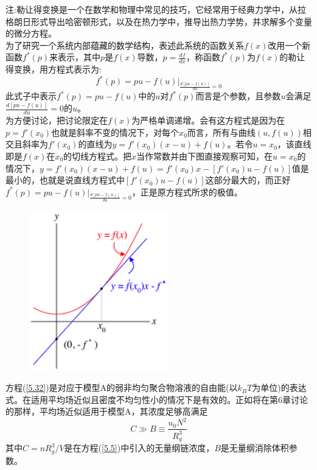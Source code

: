 注:勒让得变换是一个在数学和物理中常见的技巧，它经常用于经典力学中，从拉格朗日形式导出哈密顿形式，以及在热力学中，推导出热力学势，并求解多个变量的微分方程。\\
为了研究一个系统内部蕴藏的数学结构，表述此系统的函数关系$f(x)$改用一个新函数$f^*(p)$来表示，其中$p$是$f(x)$导数，$p =\frac{df}{dx}$，称函数$f^*(p)$为$f(x)$的勒让得变换，用方程式表示为:
\begin{equation*}
f^*(p)=pu-f(u)\big|_{\frac{d[pu-f(u)]}{du}=0}
\end{equation*}
此式子中表示$f^*(p)=pu-f(u)$中的$u$对$f^*(p)$而言是个参数，且参数$u$会满足$\frac{d[pu-f(u)]}{du}=0$的$u$。\\
为方便讨论，把讨论限定在$f(x)$为严格单调递增。会有这方程式是因为在$p=f'(x_0)$也就是斜率不变的情况下，对每个$x_0$而言，所有与曲线$(u,f(u))$相交且斜率为$f'(x_0)$的直线为$y=f'(x_0)(x-u)+f(u)$。若令$u=x_0$，该直线即是$f(x)$在$x_0$的切线方程式。把$x$当作常数并由下图直接观察可知，在$u=x_0$的情况下，$y=f'(x_0)(x-u)+f(u)=f'(x_0)x-[f'(x_0)u-f(u)]$值是最小的，也就是说直线方程式中$[f'(x_0)u-f(u)]$这部分最大的，而正好$f^*(p)=pu-f(u)\big|_{\frac{d[pu-f(u)]}{du}=0}$，正是原方程式所求的极值。
\begin{figure}[H]
      \centering
      \includegraphics[width=6cm]{./figures/5.png}
\end{figure}
方程(\ref{5.32})是对应于模型A的弱非均匀聚合物溶液的自由能(以$k_BT$为单位)的表达式。在适用平均场近似且密度不均匀性小的情况下是有效的。正如将在第6章讨论的那样，平均场近似适用于模型A，其浓度足够高满足
\begin{equation}
C\gg B\equiv\frac{u_0N^2}{R_g^3}
\end{equation}
其中$C=nR_g^3/V$是在方程(\ref{5.5})中引入的无量纲链浓度，$B$是无量纲消除体积参数。

